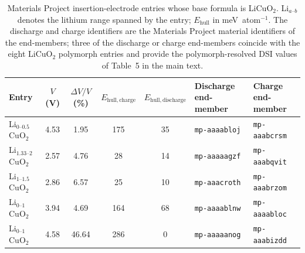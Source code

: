 \documentclass[10pt]{article}
\begin{document}
\begin{table}[htbp]
\centering
\caption{Materials Project insertion-electrode entries whose base formula is LiCuO$_2$. Li$_{a\text{--}b}$ denotes the lithium range spanned by the entry; $E_\mathrm{hull}$ in meV~atom$^{-1}$. The discharge and charge identifiers are the Materials Project material identifiers of the end-members; three of the discharge or charge end-members coincide with the eight LiCuO$_2$ polymorph entries and provide the polymorph-resolved DSI values of Table~5 in the main text.}
\label{tab:s4_licuo2}
\setlength{\tabcolsep}{5pt}
\renewcommand{\arraystretch}{1.25}
\footnotesize
\begin{tabular}{l c c c c l l}
\hline
Entry & $V$ (V) & $\Delta V/V$ (\%) & $E_\mathrm{hull,charge}$ & $E_\mathrm{hull,discharge}$ & Discharge end-member & Charge end-member \\
\hline
Li$_{0\text{--}0.5}$CuO$_{2}$ & 4.53 & 1.95 & 175 & 35 & \texttt{mp-aaaabloj} & \texttt{mp-aaabcrsm} \\
Li$_{1.33\text{--}2}$CuO$_{2}$ & 2.57 & 4.76 & 28 & 14 & \texttt{mp-aaaaagzf} & \texttt{mp-aaabqvit} \\
Li$_{1\text{--}1.5}$CuO$_{2}$ & 2.86 & 6.57 & 25 & 10 & \texttt{mp-aaacroth} & \texttt{mp-aaabrzom} \\
Li$_{0\text{--}1}$CuO$_{2}$ & 3.94 & 4.69 & 164 & 68 & \texttt{mp-aaaablnw} & \texttt{mp-aaaabloc} \\
Li$_{0\text{--}1}$CuO$_{2}$ & 4.58 & 46.64 & 286 & 0 & \texttt{mp-aaaaanog} & \texttt{mp-aaabizdd} \\
\hline
\end{tabular}
\end{table}
\end{document}
